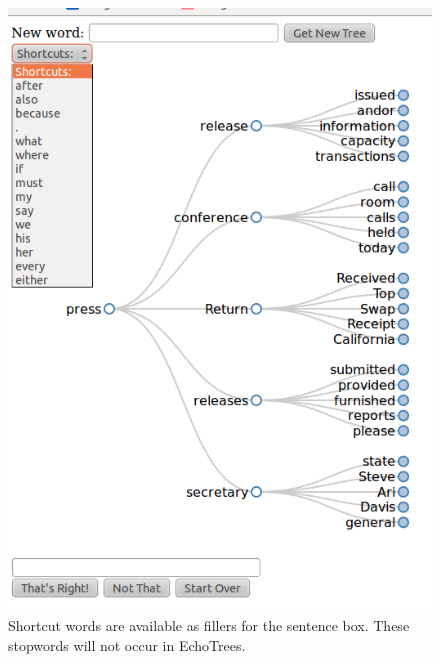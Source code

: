 \documentclass{sigchi}
\begin{document}
\begin{figure}
   \centering
   \includegraphics[width=\columnwidth]{Figs/echoTreePulldownSnapshotSmall.png}
   \caption{Shortcut words are available as fillers for the sentence
     box. These stopwords will not occur in EchoTrees.}
   \label{fig:shortcuts}
\end{figure}

%
%
%
%
%
\balance



\end{document}
